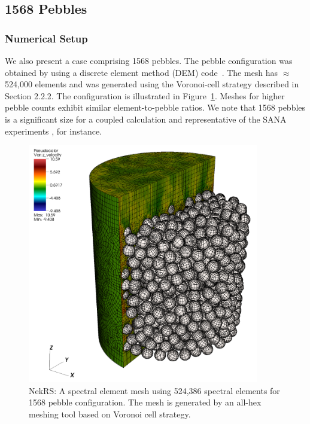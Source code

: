 \subsection{1568 Pebbles}

\subsubsection{Numerical Setup}

We also present a case comprising 1568 pebbles. The pebble configuration was
obtained by using a discrete element method (DEM)
code~\cite{projectChronoWebSite}.  The mesh has $\approx$ 524,000 elements and
was generated using the Voronoi-cell strategy described in Section 2.2.2.
The configuration is illustrated in Figure~\ref{f:ndemo1}.
Meshes for higher pebble counts exhibit similar element-to-pebble ratios.
We note that 1568 pebbles is a significant size for a coupled calculation and
representative of the SANA experiments \cite{zou2017validation}, for instance.

\begin{figure}[!h]
\centering
\includegraphics[clip=true,width=0.9\textwidth]{Figures/ndemo_r1}
\caption{NekRS: A spectral element mesh using 524,386 spectral elements for 1568 pebble configuration.
         The mesh is generated by an all-hex meshing tool based on Voronoi cell strategy.}
\label{f:ndemo1}
\end{figure}

